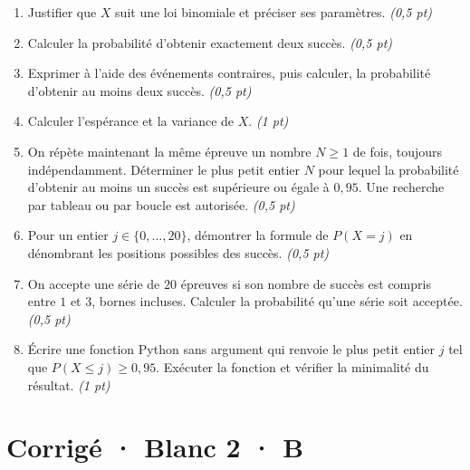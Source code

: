 \begin{enumerate}

\item Justifier que $X$ suit une loi binomiale et préciser ses paramètres. \hfill\textit{(0{,}5 pt)}

\item Calculer la probabilité d'obtenir exactement deux succès. \hfill\textit{(0{,}5 pt)}

\item Exprimer à l'aide des événements contraires, puis calculer, la probabilité d'obtenir au moins deux succès. \hfill\textit{(0{,}5 pt)}

\item Calculer l'espérance et la variance de $X$. \hfill\textit{(1 pt)}

\item On répète maintenant la même épreuve un nombre $N\ge1$ de fois, toujours indépendamment. Déterminer le plus petit entier $N$ pour lequel la probabilité d'obtenir au moins un succès est supérieure ou égale à $0{,}95$. Une recherche par tableau ou par boucle est autorisée. \hfill\textit{(0{,}5 pt)}

\item Pour un entier $j\in\{0,\ldots,20\}$, démontrer la formule de $P(X=j)$ en dénombrant les positions possibles des succès. \hfill\textit{(0{,}5 pt)}

\item On accepte une série de $20$ épreuves si son nombre de succès est compris entre $1$ et $3$, bornes incluses. Calculer la probabilité qu'une série soit acceptée. \hfill\textit{(0{,}5 pt)}

\item Écrire une fonction Python sans argument qui renvoie le plus petit entier $j$ tel que $P(X\le j)\ge0{,}95$. Exécuter la fonction et vérifier la minimalité du résultat. \hfill\textit{(1 pt)}

\end{enumerate}

\ifmxteacher\mxnewpage

\section*{Corrigé · Blanc 2 · B}\label{cor:8-4}

